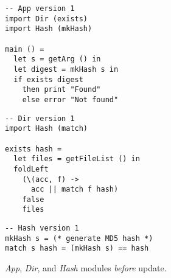 \begin{figure}
\centering
\begin{lstlisting}[style=haskell]
-- App version 1
import Dir (exists)
import Hash (mkHash)

main () =
  let s = getArg () in
  let digest = mkHash s in
  if exists digest
    then print "Found"
    else error "Not found"
\end{lstlisting}

\begin{lstlisting}[style=haskell]
-- Dir version 1
import Hash (match)

exists hash = 
  let files = getFileList () in
  foldLeft
    (\(acc, f) ->
      acc || match f hash)
    false
    files
\end{lstlisting}

\begin{lstlisting}[style=haskell]
-- Hash version 1
mkHash s = (* generate MD5 hash *)
match s hash = (mkHash s) == hash
\end{lstlisting}

\caption{\textit{App}, \textit{Dir}, and \textit{Hash} modules \emph{before} update.}
\label{list1}
\end{figure}